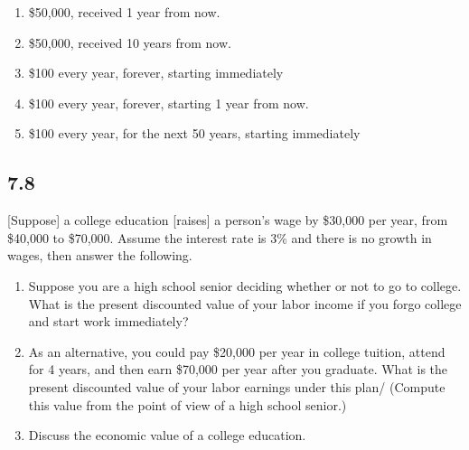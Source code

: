 \documentclass{article}
\begin{document}
\begin{enumerate}
\item \$50,000, received 1 year from now.
\item \$50,000, received 10 years from now.
\item \$100 every year, forever, starting immediately
\item \$100 every year, forever, starting 1 year from now.
\item \$100 every year, for the next 50 years, starting immediately
\end{enumerate}

\subsection*{7.8}

[Suppose] a college education [raises] a person's wage by \$30,000 per year, from \$40,000 to \$70,000. Assume the interest rate is 3\% and there is no growth in wages, then answer the following.

\begin{enumerate}
\item Suppose you are a high school senior deciding whether or not to go to college. What is the present discounted value of your labor income if you forgo college and start work immediately?

\item As an alternative, you could pay \$20,000 per year in college tuition, attend for 4 years, and then earn \$70,000 per year after you graduate. What is the present discounted value of your labor earnings under this plan/ (Compute this value from the point of view of a high school senior.)

\item Discuss the economic value of a college education.
\end{enumerate}
\end{document}
